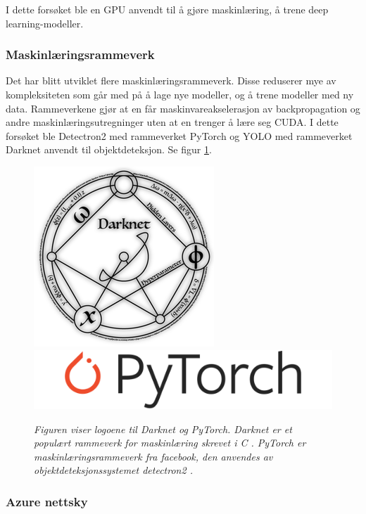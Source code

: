 I dette forsøket ble en GPU anvendt til å gjøre maskinlæring, å trene deep learning-modeller.

\subsubsection{Maskinlæringsrammeverk}

Det har blitt utviklet flere maskinlæringsrammeverk. Disse reduserer mye av kompleksiteten som går med på å lage nye modeller, og å trene modeller med ny data. Rammeverkene gjør at en får maskinvareakselerasjon av backpropagation og andre maskinlæringsutregninger uten at en trenger å lære seg CUDA. I dette forsøket ble Detectron2 med rammeverket PyTorch og YOLO med rammeverket Darknet anvendt til objektdeteksjon. Se figur \ref{fig:dl_libs}.

\begin{figure}[t]
\begin{center} 
\includegraphics[scale=0.30]{figures/darknet-logo}
\includegraphics[scale=0.30]{figures/Pytorch_logo}
\caption{\small \sl Figuren viser logoene til Darknet og PyTorch. Darknet er et populært rammeverk for maskinlæring skrevet i C \cite{Redmon 2016}. PyTorch er maskinlæringsrammeverk fra facebook, den anvendes av objektdeteksjonssystemet detectron2 \cite{Wu m.fl. 2020}. \label{fig:dl_libs}}
\end{center} 
\end{figure} 

\subsubsection{Azure nettsky}

